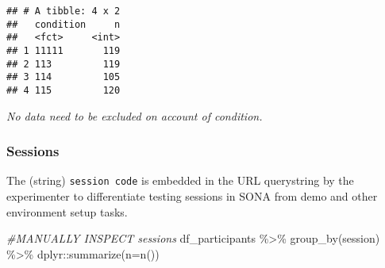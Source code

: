 \documentclass[
]{article}
\newenvironment{Shaded}{\begin{snugshade}}{\end{snugshade}}
\newcommand{\AttributeTok}[1]{\textcolor[rgb]{0.77,0.63,0.00}{#1}}
\newcommand{\CommentTok}[1]{\textcolor[rgb]{0.56,0.35,0.01}{\textit{#1}}}
\newcommand{\FunctionTok}[1]{\textcolor[rgb]{0.00,0.00,0.00}{#1}}
\newcommand{\NormalTok}[1]{#1}
\newcommand{\OtherTok}[1]{\textcolor[rgb]{0.56,0.35,0.01}{#1}}
\newcommand{\SpecialCharTok}[1]{\textcolor[rgb]{0.00,0.00,0.00}{#1}}
\newcommand{\StringTok}[1]{\textcolor[rgb]{0.31,0.60,0.02}{#1}}
\begin{document}
\begin{verbatim}
## # A tibble: 4 x 2
##   condition     n
##   <fct>     <int>
## 1 11111       119
## 2 113         119
## 3 114         105
## 4 115         120
\end{verbatim}

\begin{Shaded}
\end{Shaded}

\emph{No data need to be excluded on account of condition.}

\hypertarget{sessions}{%
\subsubsection{Sessions}\label{sessions}}

The (string) \texttt{session\ code} is embedded in the URL querystring
by the experimenter to differentiate testing sessions in SONA from demo
and other environment setup tasks.

\begin{Shaded}
\begin{Highlighting}[]
\CommentTok{\#MANUALLY INSPECT sessions}
\NormalTok{df\_participants }\SpecialCharTok{\%\textgreater{}\%} \FunctionTok{group\_by}\NormalTok{(session) }\SpecialCharTok{\%\textgreater{}\%} 
\NormalTok{  dplyr}\SpecialCharTok{::}\FunctionTok{summarize}\NormalTok{(}\AttributeTok{n=}\FunctionTok{n}\NormalTok{())}
\end{Highlighting}
\end{Shaded}
\end{document}
